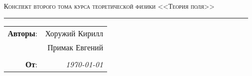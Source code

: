 \vspace{2cm}

\begin{center}
    \LARGE \textsc{Конспект второго тома курса теоретической физики <<Теория поля>>}
\end{center}

\hrule

\begin{flushright}
    \begin{tabular}{rr}
        \textbf{Авторы}: 
        & Хоружий Кирилл \\
        & Примак Евгений \\
        &\\
        \textbf{От}: &
        \textit{\today}\\
    \end{tabular}
\end{flushright}

\thispagestyle{empty}
\tableofcontents
\newpage